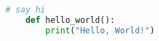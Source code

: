 
\begin{lstlisting}[language=python]
    # say hi
    def hello_world():
        print("Hello, World!")
\end{lstlisting}
